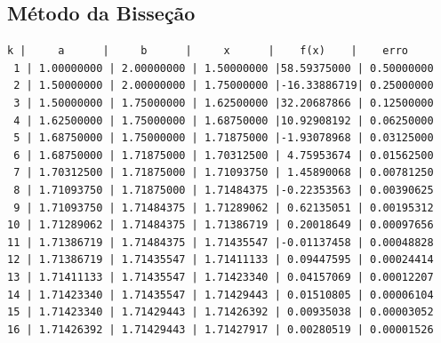\documentclass{article}
\begin{document}
\subsection{Método da Bisseção}
\begin{verbatim}
k |     a      |     b      |     x      |    f(x)    |    erro    
 1 | 1.00000000 | 2.00000000 | 1.50000000 |58.59375000 | 0.50000000 
 2 | 1.50000000 | 2.00000000 | 1.75000000 |-16.33886719| 0.25000000 
 3 | 1.50000000 | 1.75000000 | 1.62500000 |32.20687866 | 0.12500000 
 4 | 1.62500000 | 1.75000000 | 1.68750000 |10.92908192 | 0.06250000 
 5 | 1.68750000 | 1.75000000 | 1.71875000 |-1.93078968 | 0.03125000 
 6 | 1.68750000 | 1.71875000 | 1.70312500 | 4.75953674 | 0.01562500 
 7 | 1.70312500 | 1.71875000 | 1.71093750 | 1.45890068 | 0.00781250 
 8 | 1.71093750 | 1.71875000 | 1.71484375 |-0.22353563 | 0.00390625 
 9 | 1.71093750 | 1.71484375 | 1.71289062 | 0.62135051 | 0.00195312 
10 | 1.71289062 | 1.71484375 | 1.71386719 | 0.20018649 | 0.00097656 
11 | 1.71386719 | 1.71484375 | 1.71435547 |-0.01137458 | 0.00048828 
12 | 1.71386719 | 1.71435547 | 1.71411133 | 0.09447595 | 0.00024414 
13 | 1.71411133 | 1.71435547 | 1.71423340 | 0.04157069 | 0.00012207 
14 | 1.71423340 | 1.71435547 | 1.71429443 | 0.01510805 | 0.00006104 
15 | 1.71423340 | 1.71429443 | 1.71426392 | 0.00935038 | 0.00003052 
16 | 1.71426392 | 1.71429443 | 1.71427917 | 0.00280519 | 0.00001526 
\end{verbatim}
\end{document}
